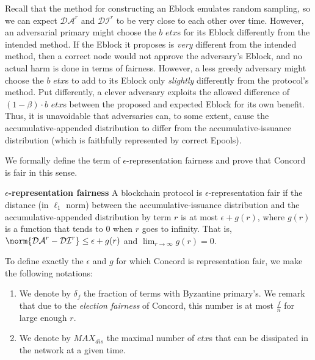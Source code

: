
Recall that the method for constructing an Eblock emulates random sampling, so we can expect $\mathcal{DA}^r$ and $\mathcal{DI}^r$ to be very close to each other over time. However, an adversarial primary might choose the $b$ $etx$s for its Eblock differently from the intended method. If the Eblock it proposes is \emph{very} different from the intended method, then a correct node would not approve the adversary's Eblock, and no actual harm is done in terms of fairness. However, a less greedy adversary might choose the $b$ $etx$s to add to its Eblock only \emph{slightly} differently from the protocol's method. Put differently, a clever adversary exploits the allowed difference of $(1-\beta)\cdot b$ $etx$s between the proposed and expected Eblock for its own benefit. Thus, it is unavoidable that adversaries can, to some extent, cause the accumulative-appended distribution to differ from the accumulative-issuance distribution (which is faithfully represented by correct Epools). 

We formally define the term of $\epsilon$-representation fairness and prove that Concord is fair in this sense. 

\begin{definition}{\textbf{$\epsilon$-representation fairness}} A blockchain protocol is $\epsilon$-representation fair if the distance (in $\ell _1$ norm) between the accumulative-issuance distribution and the accumulative-appended distribution by term $r$ is at most $\epsilon+g(r)$, where $g(r)$ is a function that tends to $0$ when $r$ goes to infinity. That is,  $\norm{\mathcal{DA}^r-\mathcal{DI}^{r}}\leq \epsilon+g(r)$ and $\lim _{r\rightarrow \infty}g(r)=0$.
\end{definition}
 
To define exactly the $\epsilon$ and $g$ for which Concord is representation fair, we make the following notations: 
\begin{enumerate}
    \item We denote by $\delta_f$ the fraction of terms with Byzantine primary's. We remark that due to the \textit{election fairness} of Concord, this number is at most $\frac{f}{n}$ for large enough $r$.
    \item We denote by $MAX_{dis}$ the maximal number of $etx$s that can be dissipated in the network at a given time. 
\end{enumerate}


